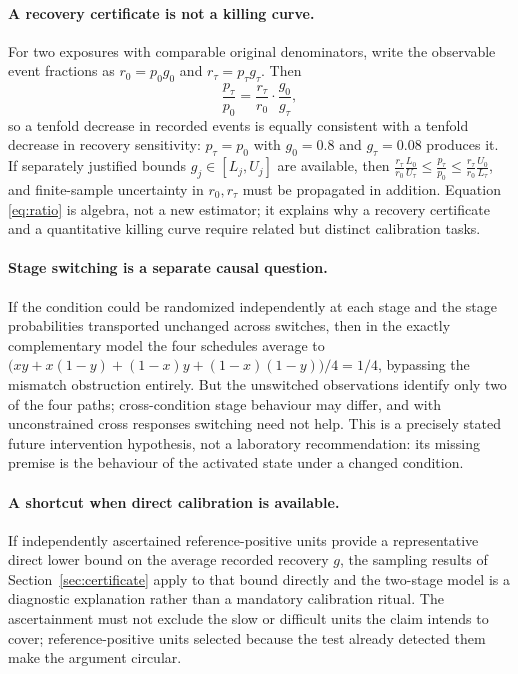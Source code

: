 \documentclass[11pt]{article}
\theoremstyle{definition}
\theoremstyle{remark}
\begin{document}
\paragraph{A recovery certificate is not a killing curve.}
For two exposures with comparable original denominators, write the observable
event fractions as $r_0=p_0g_0$ and $r_\tau=p_\tau g_\tau$. Then
\begin{equation}\label{eq:ratio}
\frac{p_\tau}{p_0}=\frac{r_\tau}{r_0}\cdot\frac{g_0}{g_\tau},
\end{equation}
so a tenfold decrease in recorded events is equally consistent with a tenfold
decrease in recovery sensitivity: $p_\tau=p_0$ with $g_0=0.8$ and $g_\tau=0.08$
produces it. If separately justified bounds $g_j\in[L_j,U_j]$ are available, then
$\frac{r_\tau}{r_0}\frac{L_0}{U_\tau}\le\frac{p_\tau}{p_0}\le
\frac{r_\tau}{r_0}\frac{U_0}{L_\tau}$, and finite-sample uncertainty in
$r_0,r_\tau$ must be propagated in addition. Equation \eqref{eq:ratio} is
algebra, not a new estimator; it explains why a recovery certificate and a
quantitative killing curve \citep{brauner2017} require related but distinct
calibration tasks.

\paragraph{Stage switching is a separate causal question.}
If the condition could be randomized independently at each stage and the stage
probabilities transported unchanged across switches, then in the exactly
complementary model the four schedules average to
$\bigl(xy+x(1-y)+(1-x)y+(1-x)(1-y)\bigr)/4=1/4$, bypassing the mismatch
obstruction entirely. But the unswitched observations identify only two of the
four paths; cross-condition stage behaviour may differ, and with unconstrained
cross responses switching need not help. This is a precisely stated future
intervention hypothesis, not a laboratory recommendation: its missing premise is
the behaviour of the activated state under a changed condition.

\paragraph{A shortcut when direct calibration is available.}
If independently ascertained reference-positive units provide a representative
direct lower bound on the average recorded recovery $g$, the sampling results of
Section~\ref{sec:certificate} apply to that bound directly and the two-stage
model is a diagnostic explanation rather than a mandatory calibration ritual.
The ascertainment must not exclude the slow or difficult units the claim intends
to cover; reference-positive units selected because the test already detected
them make the argument circular.
\end{document}
